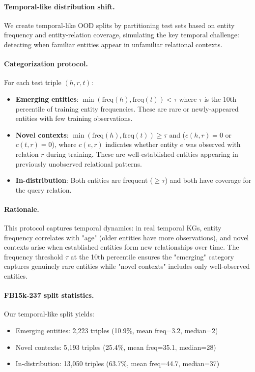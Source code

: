 \documentclass[accepted]{uai2024}  %
\begin{document}
\paragraph{Temporal-like distribution shift.}
We create temporal-like OOD splits by partitioning test sets based on entity frequency and entity-relation coverage, simulating the key temporal challenge: detecting when familiar entities appear in unfamiliar relational contexts.

\paragraph{Categorization protocol.}
For each test triple $(h,r,t)$:
\begin{itemize}
\item \textbf{Emerging entities}: $\min(\text{freq}(h), \text{freq}(t)) < \tau$ where $\tau$ is the 10th percentile of training entity frequencies. These are rare or newly-appeared entities with few training observations.

\item \textbf{Novel contexts}: $\min(\text{freq}(h), \text{freq}(t)) \geq \tau$ and ($c(h,r)=0$ or $c(t,r)=0$), where $c(e,r)$ indicates whether entity $e$ was observed with relation $r$ during training. These are well-established entities appearing in previously unobserved relational patterns.

\item \textbf{In-distribution}: Both entities are frequent ($\geq \tau$) and both have coverage for the query relation.
\end{itemize}

\paragraph{Rationale.}
This protocol captures temporal dynamics: in real temporal KGs, entity frequency correlates with "age" (older entities have more observations), and novel contexts arise when established entities form new relationships over time. The frequency threshold $\tau$ at the 10th percentile ensures the "emerging" category captures genuinely rare entities while "novel contexts" includes only well-observed entities.

\paragraph{FB15k-237 split statistics.}
Our temporal-like split yields:
\begin{itemize}
\item Emerging entities: 2,223 triples (10.9\%, mean freq=3.2, median=2)
\item Novel contexts: 5,193 triples (25.4\%, mean freq=35.1, median=28)
\item In-distribution: 13,050 triples (63.7\%, mean freq=44.7, median=37)
\end{itemize}
\end{document}

